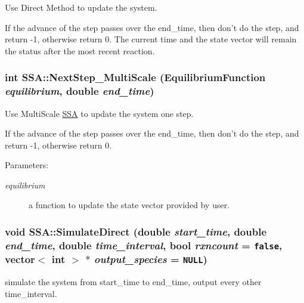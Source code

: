 Use Direct Method to update the system. 

If the advance of the step passes over the end\_\-time, then don't do the step, and return -1, otherwise return 0. The current time and the state vector will remain the status after the most recent reaction. \hypertarget{class_s_s_a_4b592f5a1a5f623fe5987a75ba860a35}{
\subsubsection{\setlength{\rightskip}{0pt plus 5cm}int SSA::NextStep\_\-MultiScale (EquilibriumFunction {\em equilibrium}, \/  double {\em end\_\-time})}}
\label{class_s_s_a_4b592f5a1a5f623fe5987a75ba860a35}


Use MultiScale \hyperlink{class_s_s_a}{SSA} to update the system one step. 

If the advance of the step passes over the end\_\-time, then don't do the step, and return -1, otherwise return 0. \begin{Desc}
\item[Parameters:]
\begin{description}
\item[{\em equilibrium}]a function to update the state vector provided by user. \end{description}
\end{Desc}
\hypertarget{class_s_s_a_b4673a32d5399bc76d96b9616b3a4de7}{
\subsubsection{\setlength{\rightskip}{0pt plus 5cm}void SSA::SimulateDirect (double {\em start\_\-time}, \/  double {\em end\_\-time}, \/  double {\em time\_\-interval}, \/  bool {\em rxncount} = {\tt false}, \/  vector$<$ int $>$ $\ast$ {\em output\_\-species} = {\tt NULL})}}
\label{class_s_s_a_b4673a32d5399bc76d96b9616b3a4de7}


simulate the system from start\_\-time to end\_\-time, output every other time\_\-interval. 

